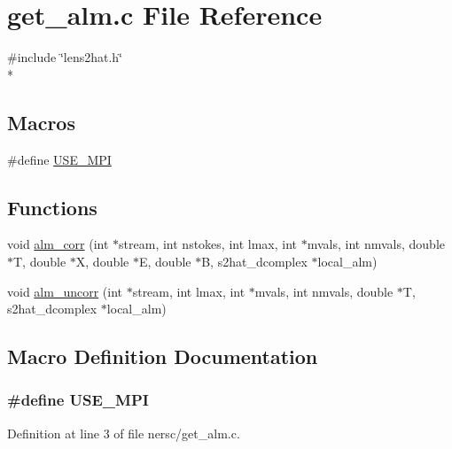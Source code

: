 \section{get\-\_\-alm.\-c File Reference}
\label{nersc_2get__alm_8c}
{\ttfamily \#include \char`\"{}lens2hat.\-h\char`\"{}}\\*
\subsection*{Macros}
\begin{DoxyCompactItemize}
\item 
\#define \hyperlink{nersc_2get__alm_8c_a3869d282031f6ea6b50fdb980b758420}{U\-S\-E\-\_\-\-M\-P\-I}
\end{DoxyCompactItemize}
\subsection*{Functions}
\begin{DoxyCompactItemize}
\item 
void \hyperlink{nersc_2get__alm_8c_a80f1d7977e804f028cad6821ef147f4b}{alm\-\_\-corr} (int $\ast$stream, int nstokes, int lmax, int $\ast$mvals, int nmvals, double $\ast$T, double $\ast$X, double $\ast$E, double $\ast$B, s2hat\-\_\-dcomplex $\ast$local\-\_\-alm)
\item 
void \hyperlink{nersc_2get__alm_8c_a58e31a888c3017dccbcf950b073dd2e9}{alm\-\_\-uncorr} (int $\ast$stream, int lmax, int $\ast$mvals, int nmvals, double $\ast$T, s2hat\-\_\-dcomplex $\ast$local\-\_\-alm)
\end{DoxyCompactItemize}


\subsection{Macro Definition Documentation}
\subsubsection[{U\-S\-E\-\_\-\-M\-P\-I}]{\setlength{\rightskip}{0pt plus 5cm}\#define U\-S\-E\-\_\-\-M\-P\-I}\label{nersc_2get__alm_8c_a3869d282031f6ea6b50fdb980b758420}


Definition at line 3 of file nersc/get\-\_\-alm.\-c.



